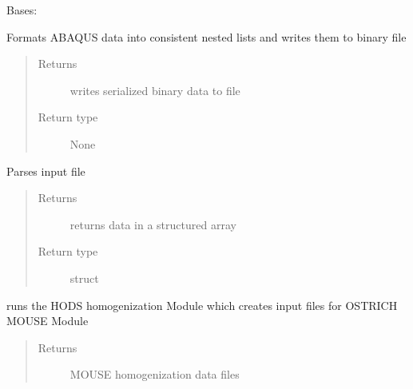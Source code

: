 \documentclass[letterpaper,10pt,english]{sphinxmanual}
\begin{document}
\begin{fulllineitems}
\label{\detokenize{MouseReferenceManual:Modules.Module_ABAQUS.Module_ABAQUS}}
Bases: {\hyperref[\detokenize{MouseReferenceManual:Modules.Base.ContinuumModuleBaseClass}]{}}

\begin{fulllineitems}
\label{\detokenize{MouseReferenceManual:Modules.Module_ABAQUS.Module_ABAQUS.formatOutput}}
Formats ABAQUS data into consistent nested lists and writes them to binary file
\begin{quote}\begin{description}
\item[{Returns}] \leavevmode
writes serialized binary data to file

\item[{Return type}] \leavevmode
None

\end{description}\end{quote}

\end{fulllineitems}


\begin{fulllineitems}
\label{\detokenize{MouseReferenceManual:Modules.Module_ABAQUS.Module_ABAQUS.parseInput}}
Parses input file
\begin{quote}\begin{description}
\item[{Returns}] \leavevmode
returns data in a structured array

\item[{Return type}] \leavevmode
struct

\end{description}\end{quote}

\end{fulllineitems}


\begin{fulllineitems}
\label{\detokenize{MouseReferenceManual:Modules.Module_ABAQUS.Module_ABAQUS.run}}
runs the HODS homogenization Module which creates input files for OSTRICH MOUSE Module
\begin{quote}\begin{description}
\item[{Returns}] \leavevmode
MOUSE homogenization data files


\end{description}
\end{quote}
\end{fulllineitems}
\end{fulllineitems}
\end{document}
